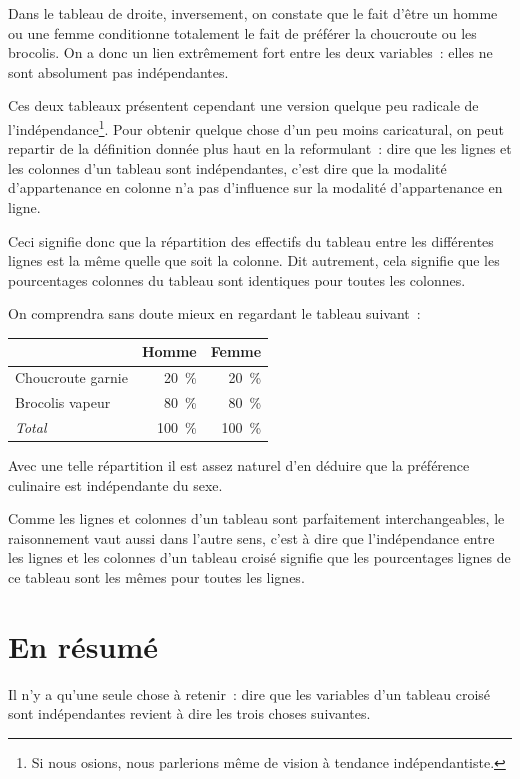 \documentclass[a4paper,10pt,twoside,francais]{report}
\begin{document}
Dans le tableau de droite, inversement, on constate que le fait
d'être un homme ou une femme conditionne totalement le fait de
préférer la choucroute ou les brocolis. On a donc un lien extrêmement fort
entre les deux variables~: elles ne sont absolument pas indépendantes.

Ces deux tableaux présentent cependant une version quelque peu
radicale de l'indépendance\footnote{Si nous osions, nous parlerions
  même de vision à tendance indépendantiste.}. Pour obtenir quelque
chose d'un peu moins caricatural, on peut repartir de la définition
donnée plus haut en la reformulant~: dire que les lignes et les
colonnes d'un tableau sont indépendantes, c'est dire que la modalité
d'appartenance en colonne n'a pas d'influence sur la modalité
d'appartenance en ligne.

Ceci signifie donc que la répartition des effectifs du tableau entre
les différentes lignes est la même quelle que soit la colonne. Dit
autrement, cela signifie que les pourcentages colonnes du tableau sont
identiques pour toutes les colonnes.

On comprendra sans doute mieux en regardant le tableau suivant~:

\begin{center}
  \begin{tabular}[!h]{lrr}
    \toprule
    & Homme & Femme \\
    \midrule
    Choucroute garnie & 20~\% & 20~\% \\
    Brocolis vapeur & 80~\% & 80~\% \\
    \textit{Total} & 100~\% & 100~\% \\
    \bottomrule
  \end{tabular}
\end{center}

Avec une telle répartition il est assez naturel d'en déduire que la
préférence culinaire est indépendante du sexe.

Comme les lignes et colonnes d'un tableau sont parfaitement
interchangeables, le raisonnement vaut aussi dans l'autre sens, c'est
à dire que l'indépendance entre les lignes et les colonnes d'un
tableau croisé signifie que les pourcentages lignes de ce tableau sont
les mêmes pour toutes les lignes.


\section{En résumé}

Il n'y a qu'une seule chose à retenir~: dire que les variables d'un
tableau croisé sont indépendantes revient à dire les trois choses
suivantes.
\end{document}
